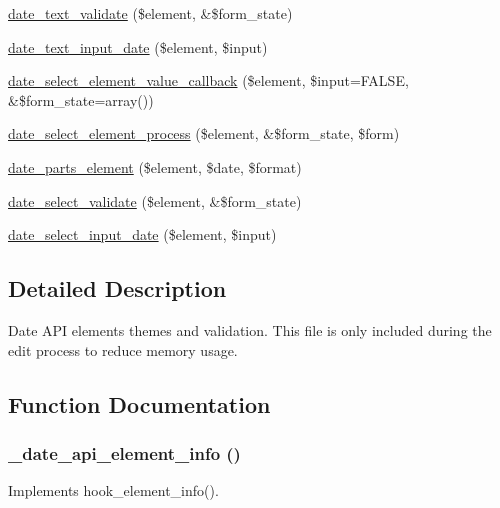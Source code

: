 \begin{DoxyCompactItemize}
\item 
\hyperlink{date__api__elements_8inc_aa6120a96cd6d04db4fe8e2ff15d39e68}{date\_\-text\_\-validate} (\$element, \&\$form\_\-state)
\item 
\hyperlink{date__api__elements_8inc_a7df91d2e64f95f23bffcb26de33d2ea8}{date\_\-text\_\-input\_\-date} (\$element, \$input)
\item 
\hyperlink{date__api__elements_8inc_a80a2f5d6b7eda94636af25ce4125142f}{date\_\-select\_\-element\_\-value\_\-callback} (\$element, \$input=FALSE, \&\$form\_\-state=array())
\item 
\hyperlink{date__api__elements_8inc_adabdb1eea05a7d11cb2108a18f01aeed}{date\_\-select\_\-element\_\-process} (\$element, \&\$form\_\-state, \$form)
\item 
\hyperlink{date__api__elements_8inc_a9d8d4e7d43727fc350dd30c42fc5fc10}{date\_\-parts\_\-element} (\$element, \$date, \$format)
\item 
\hyperlink{date__api__elements_8inc_ab2b275d606ded86988e421c9e17d4f6d}{date\_\-select\_\-validate} (\$element, \&\$form\_\-state)
\item 
\hyperlink{date__api__elements_8inc_a80414f7f53d30346edcbe82f8ad5b69c}{date\_\-select\_\-input\_\-date} (\$element, \$input)
\end{DoxyCompactItemize}


\subsection{Detailed Description}
Date API elements themes and validation. This file is only included during the edit process to reduce memory usage. 

\subsection{Function Documentation}
\hypertarget{date__api__elements_8inc_aeffcad67abcab341ed4617c76a59df43}{
\subsubsection[{\_\-date\_\-api\_\-element\_\-info}]{\setlength{\rightskip}{0pt plus 5cm}\_\-date\_\-api\_\-element\_\-info ()}}
\label{date__api__elements_8inc_aeffcad67abcab341ed4617c76a59df43}
Implements hook\_\-element\_\-info().

